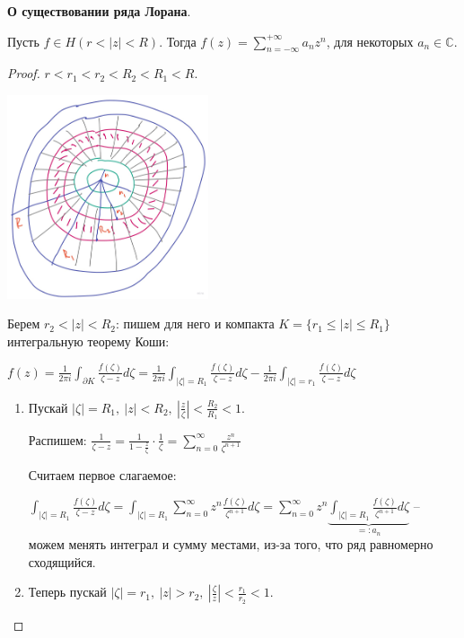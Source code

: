 \begin{theorem}
    \textbf{О существовании ряда Лорана}.

    Пусть $f \in H(r < |z| < R)$. Тогда $f(z) = \sum_{n = -\infty}^{+\infty} a_n z^n$, для некоторых $a_n \in \mathbb{C}$.
\end{theorem}
\begin{proof}
    $r < r_1 < r_2 < R_2 < R_1 < R$.

    \begin{center}
        \includegraphics[height=6cm]{assets/04-functions-of-complex-variables/existence-of-function-decomposition-into-loran-series.jpg}
    \end{center}

    Берем $r_2 < |z| < R_2$: пишем для него и компакта $K =\{ r_1 \leq |z| \leq R_1 \}$ интегральную теорему Коши:

    $f(z) = \frac{1}{2 \pi i} \int_{\partial K} {\frac{f(\zeta)}{\zeta - z} d\zeta} = \frac{1}{2 \pi i} \int_{|\zeta| = R_1} { \frac{f(\zeta)}{\zeta - z} d\zeta } - \frac{1}{2 \pi i} \int_{|\zeta| = r_1} { \frac{f(\zeta)}{\zeta - z} d\zeta }$

    \begin{enumerate}
        \item {
            Пускай $|\zeta| = R_1, \ |z| < R_2, \ |\frac{z}{\zeta}| < \frac{R_2}{R_1} < 1$.

            Распишем: $\frac{1}{\zeta - z} = \frac{1}{1 - \frac{z}{\zeta}} \cdot \frac{1}{\zeta} = \sum_{n=0}^{\infty} { \frac{z^n}{\zeta^{n+1}} }$

            Считаем первое слагаемое:

            $\int_{|\zeta| = R_1} { \frac{f(\zeta)}{\zeta - z} d\zeta } = \int_{|\zeta| = R_1} { \sum_{n=0}^{\infty} z^n \frac{f(\zeta)}{\zeta^{n+1}} d\zeta } = \sum_{n = 0}^{\infty} {z^n \underbrace{\int_{|\zeta| = R_1} { \frac{f(\zeta)}{\zeta^{n + 1}} d\zeta }}_{=: a_n}}$ -- можем менять интеграл и сумму местами, из-за того, что ряд равномерно сходящийся.
        }
        \item {
            Теперь пускай $|\zeta| = r_1, \ |z| > r_2, \ |\frac{\zeta}{z}| < \frac{r_1}{r_2} < 1$.

}
\end{enumerate}
\end{proof}
